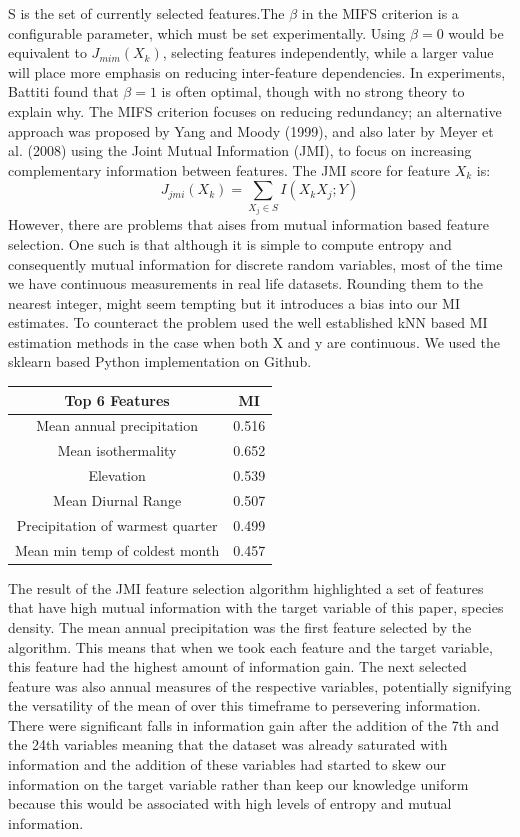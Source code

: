 \documentclass[prl,showpacs,superscriptaddress,twocolumn,longbibliography]{revtex4-1}
\begin{document}
S is the set of currently selected features.The $ \beta $ in the MIFS criterion is a configurable parameter, which must be set experimentally. Using $\beta  = 0 $ would be equivalent to $J_{mim}(X_k)$, selecting features independently, while a larger value will place more emphasis on reducing inter-feature dependencies. In experiments, Battiti found that $\beta  = 1$ is often optimal, though with no strong theory to explain why. The MIFS criterion focuses on reducing redundancy; an alternative approach was proposed by Yang and Moody (1999), and also later by Meyer et al. (2008) using the Joint Mutual Information (JMI), to focus on increasing complementary information between features\cite{Brown2012}. The JMI score for feature $X_k$ is:
\[ 
    J_{jmi}(X_k) =  \sum_{X_j\in S} I(X_kX_j;Y)
\]
However, there are problems that aises from mutual information based feature selection. One such is that although it is simple to compute entropy and consequently mutual information for discrete random variables, most of the time we have continuous measurements in real life datasets. Rounding them to the nearest integer, might seem tempting but it introduces a bias into our MI estimates. To counteract the problem used the well established kNN based MI estimation methods in the case when both X and y are continuous\cite{Daniel,Ross2014}. We used the sklearn based Python implementation on Github\cite{i9}.


\begin{center}
\begin{tabular}{||c c||} 
 \hline
Top 6 Features & MI \\
 \hline\hline
 Mean annual precipitation & 0.516\\ 
 \hline
 Mean isothermality & 0.652\\
  \hline
 Elevation & 0.539\\
 \hline
 Mean Diurnal Range & 0.507\\
 \hline
 Precipitation of warmest quarter & 0.499\\
 \hline
 Mean min temp of coldest month & 0.457\\ [1ex] 
 \hline
\end{tabular}
\end{center}

The result of the JMI feature selection algorithm highlighted a set of features that have high mutual information with the target variable of this paper, species density. The mean annual precipitation was the first feature selected by the algorithm. This means that when we took each feature and the target variable, this feature had the highest amount of information gain. The next selected feature was also annual measures of the respective variables, potentially signifying the versatility of the mean of over this timeframe to persevering information. There were significant falls in information gain after the addition of the 7th and the 24th variables meaning that the dataset was already saturated with information and the addition of these variables had started to skew our information on the target variable rather than keep our knowledge uniform because this would be associated with high levels of entropy and mutual information.
\end{document}

